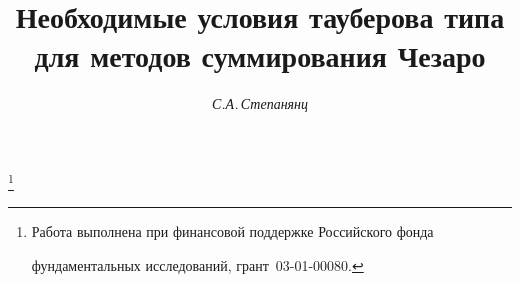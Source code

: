 









\newcommand{\tts}[1]{}







\setcounter{page}{61}















\author{\it С.А.\,Степанянц}




\title{Необходимые условия тауберова типа\\


для методов суммирования Чезаро}


\thanks{Работа выполнена при финансовой поддержке Российского фонда


фундаментальных исследований, грант \No\,03-01-00080.}





\date{}




\pagestyle{plain} %







\maketitle


